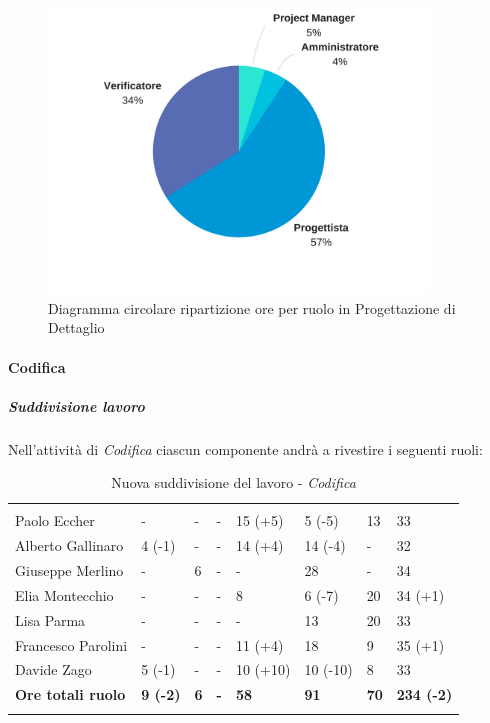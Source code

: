 \begin{figure}[H] 
	\centering 
	\includegraphics[width=0.9\textwidth]{images/CircolareProgettazioneDiDettaglioNuova.png} 
	\caption{Diagramma circolare ripartizione ore per ruolo in Progettazione di Dettaglio}
	\label{CircolareProgettazioneDiDettaglio}
\end{figure}


\paragraph{Codifica}\Spazio
	\subparagraph{Suddivisione lavoro} \Spazio
	Nell'attività di \textit{Codifica} ciascun componente andrà a rivestire i seguenti ruoli:
	\begin{table}[H]
		\centering
		\begin{tabular}{|C{4cm}|C{0.8cm}|C{0.8cm}|C{0.8cm}|C{0.9cm}|C{0.9cm}|C{0.8cm}|C{2.5cm}|}
			 & & &&&&&\\
			Paolo Eccher      & - & - & - & 15 (+5) & 5 (-5) & 13 & 33 \\
			\hline
			Alberto Gallinaro & 4 (-1) & - & - & 14 (+4) & 14 (-4) & - & 32 \\
			\hline
			Giuseppe Merlino  & - & 6 & - & - & 28 & - & 34 \\
			\hline
			Elia Montecchio   & - & - & - & 8 & 6 (-7) & 20 & 34 (+1) \\
			\hline
			Lisa Parma        & - & - & - & - & 13 & 20 & 33 \\
			\hline
			Francesco Parolini& - & - & - & 11 (+4) & 18 & 9 & 35 (+1) \\
			\hline
			Davide Zago       & 5 (-1) & - & - & 10 (+10) & 10 (-10) & 8 & 33 \\
			\hline
			\textbf{Ore totali ruolo}  & \textbf{9 (-2)} & \textbf{6} & \textbf{-} & \textbf{58} & \textbf{91} & \textbf{70} & \textbf{234 (-2)} \\
		\end{tabular}
		\caption{Nuova suddivisione del lavoro - \textit{Codifica}}
	\end{table}
	
